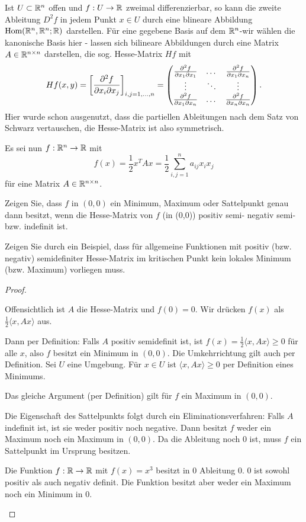 \begin{Problem}
	Ist $U\subset \mathbb{R}^n$ offen und $f:U\to \mathbb{R}$ zweimal differenzierbar, so kann die zweite Ableitung $D^2f$ in jedem Punkt $x\in U$ durch eine blineare Abbildung $\text{Hom}(\mathbb{R}^n,\mathbb{R}^n;\mathbb{R})$ darstellen. F\"{u}r eine gegebene Basis auf dem $\mathbb{R}^n$-wir wählen die kanonische Basis hier - lassen sich bilineare Abbildungen durch eine Matrix $A\in \mathbb{R}^{n\times n}$ darstellen, die sog. Hesse-Matrix $Hf$ mit
	\[
		Hf(x,y)=\left[ \pdv[2]{f}{x_i}{x_j}(x) \right]_{i,j=1,\dots, n}=\begin{pmatrix} \pdv[2]{f}{x_1}{x_1} & \dots & \pdv[2]{f}{x_1}{x_n} \\ \vdots & \ddots & \vdots \\ \pdv[2]{f}{x_1}{x_n} & \dots & \pdv[2]{f}{x_n}{x_n}\end{pmatrix} 
	.\] 
Hier wurde schon ausgenutzt, dass die partiellen Ableitungen nach dem Satz von Schwarz vertauschen, die Hesse-Matrix ist also symmetrisch.

Es sei nun $f:\mathbb{R}^n\to \mathbb{R}$ mit
\[
	f(x)=\frac{1}{2}x^T Ax=\frac{1}{2}\sum_{i,j=1}^n a_{ij}x_i x_j
\]
f\"{u}r eine Matrix $A\in \mathbb{R}^{n\times n}$.
\begin{parts}
	\item Zeigen Sie, dass $f$ in $(0,0)$ ein Minimum, Maximum oder Sattelpunkt genau dann besitzt, wenn die Hesse-Matrix von $f$ (in (0,0)) positiv semi- negativ semi- bzw. indefinit ist. 
	\item Zeigen Sie durch ein Beispiel, dass für allgemeine Funktionen mit positiv (bzw. negativ) semidefiniter Hesse-Matrix im kritischen Punkt kein lokales Minimum (bzw. Maximum) vorliegen muss.  
\end{parts}
\end{Problem}
\begin{proof}
	\begin{parts}
	\item Offensichtlich ist $A$ die Hesse-Matrix und $f(0)=0$. Wir drücken $f(x)$ als $\frac{1}{2}\langle x, Ax\rangle$ aus.

	Dann per Definition: Falls $A$ positiv semidefinit ist, ist $f(x)=\frac{1}{2}\langle x, Ax\rangle\ge 0$ f\"{u}r alle $x$, also $f$ besitzt ein Minimum in $(0,0)$. Die Umkehrrichtung gilt auch per Definition. Sei $U$ eine Umgebung. F\"{u}r $x\in U$ ist $\langle x, Ax\rangle \ge 0$ per Definition eines Minimums. 

	Das gleiche Argument (per Definition) gilt f\"{u}r $f$ ein Maximum in $(0,0)$.

	Die Eigenschaft des Sattelpunkts folgt durch ein Eliminationsverfahren: Falls $A$ indefinit ist, ist sie weder positiv noch negative. Dann besitzt $f$ weder ein Maximum noch ein Maximum in $(0,0)$. Da die Ableitung noch $0$ ist, muss $f$ ein Sattelpunkt im Ursprung besitzen.
\item Die Funktion $f:\mathbb{R}\to\mathbb{R}$ mit $f(x)=x^3$ besitzt in $0$ Ableitung $0$. $0$ ist sowohl positiv als auch negativ definit. Die Funktion besitzt aber weder ein Maximum noch ein Minimum in $0$.\qedhere
\end{parts}
\end{proof}
